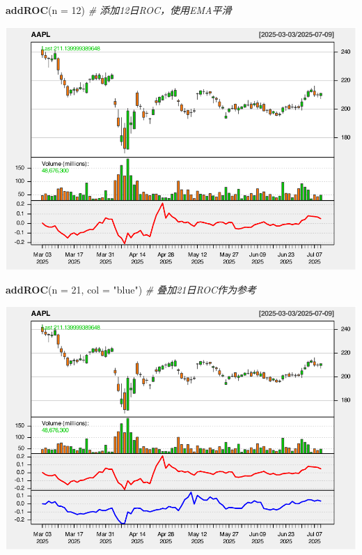 \documentclass[]{ctexbook}
\newenvironment{Shaded}{\begin{snugshade}}{\end{snugshade}}
\newcommand{\AttributeTok}[1]{\textcolor[rgb]{0.13,0.29,0.53}{#1}}
\newcommand{\CommentTok}[1]{\textcolor[rgb]{0.56,0.35,0.01}{\textit{#1}}}
\newcommand{\DecValTok}[1]{\textcolor[rgb]{0.00,0.00,0.81}{#1}}
\newcommand{\FunctionTok}[1]{\textcolor[rgb]{0.13,0.29,0.53}{\textbf{#1}}}
\newcommand{\NormalTok}[1]{#1}
\newcommand{\StringTok}[1]{\textcolor[rgb]{0.31,0.60,0.02}{#1}}
\begin{document}
\begin{Shaded}
\begin{Highlighting}[]
\FunctionTok{addROC}\NormalTok{(}\AttributeTok{n =} \DecValTok{12}\NormalTok{)  }\CommentTok{\# 添加12日ROC，使用EMA平滑  }
\end{Highlighting}
\end{Shaded}

\includegraphics[width=0.9\linewidth]{quantmod_files/figure-latex/roc_2-2}

\begin{Shaded}
\begin{Highlighting}[]
\FunctionTok{addROC}\NormalTok{(}\AttributeTok{n =} \DecValTok{21}\NormalTok{, }\AttributeTok{col =} \StringTok{"blue"}\NormalTok{)  }\CommentTok{\# 叠加21日ROC作为参考 }
\end{Highlighting}
\end{Shaded}

\includegraphics[width=0.9\linewidth]{quantmod_files/figure-latex/roc_2-3}
\end{document}
